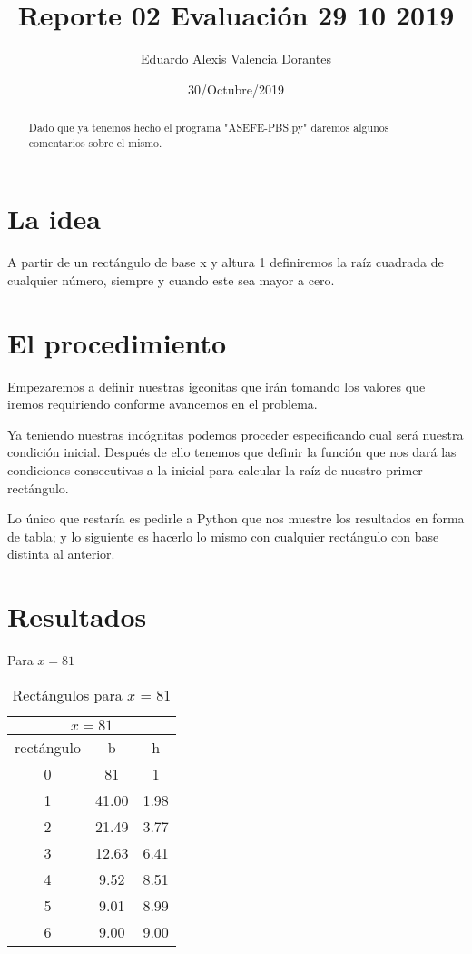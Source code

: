 \documentclass[letter,12pt]{article}
\title{Reporte 02 Evaluación 29 10 2019}
\author{Eduardo Alexis Valencia Dorantes}
\date{30/Octubre/2019}
\begin{document}
	

\begin{abstract}
Dado que ya tenemos hecho el programa "ASEFE-PBS.py" daremos algunos comentarios sobre el mismo.
\end{abstract}

\section*{La idea}
A partir de un rectángulo de base x y altura 1 definiremos la raíz cuadrada de cualquier número, siempre y cuando este sea mayor a cero.
\section*{El procedimiento}
Empezaremos a definir nuestras igconitas que irán tomando los valores que iremos requiriendo conforme avancemos en el problema.

Ya teniendo nuestras incógnitas podemos proceder especificando cual será nuestra condición inicial. Después de ello tenemos que definir la función que nos dará las condiciones consecutivas a la inicial para calcular la raíz de nuestro primer rectángulo.

Lo único que restaría es pedirle a Python que nos muestre los resultados en forma de tabla; y lo siguiente es hacerlo lo mismo con cualquier rectángulo con base distinta al anterior.
\newpage
\section*{Resultados}
Para $x = 81$
\begin{table}[h!]
	\centering
	\begin{tabular}{ |c|c|c| } 
		\multicolumn{3}{c}{$x = 81$}\\
		\hline
		rectángulo & b & h \\
		\hline
		0& 81	& 1\\
		1& 41.00	& 1.98\\
		2& 21.49	& 3.77\\
		3& 12.63	& 6.41\\
		4&  9.52	& 8.51\\
		5&  9.01	& 8.99\\
		6&  9.00    & 9.00\\
		\hline
	\end{tabular}
	\caption{Rectángulos para $x$ = 81 }
	\label{table:1}
\end{table}
\end{document}
